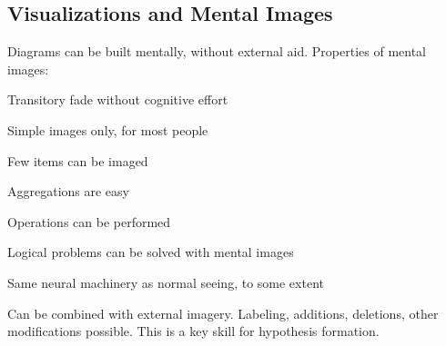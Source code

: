 \begin{mdframed}\begin{multicols}{2}
\subsection{Visualizations and Mental Images}
Diagrams can be built mentally, without external aid.
Properties of mental images:
\begin{compactdesc}
\item[Transitory] fade without cognitive effort
\item[Simple] images only, for most people
\item[Few] items can be imaged
\item[Aggregations] are easy
\item[Operations] can be performed
\item[Logical problems] can be solved with mental images
\item[Same neural] machinery as normal seeing, to some extent
\item[Can be combined with external] imagery. Labeling, additions, deletions,
    other modifications possible. This is a key skill for hypothesis formation.
\end{compactdesc}
\end{multicols}\end{mdframed}





